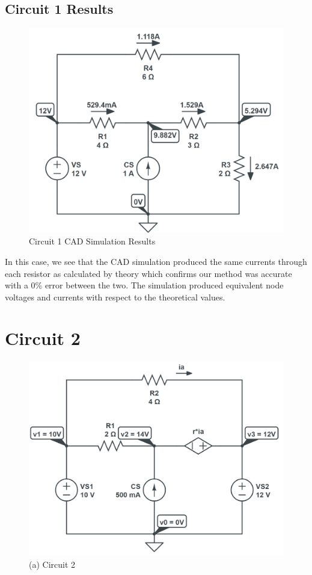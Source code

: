 \documentclass[12pt]{article}
\begin{document}
\subsection{Circuit 1 Results}
\begin{figure}[H]
    \begin{center}
        \includegraphics[scale=0.6]{circuit-1-sol.png}
        \caption { Circuit 1 CAD Simulation Results}
    \end{center}
\end{figure}

In this case, we see that the CAD simulation produced the same currents through each resistor as calculated by theory which confirms our method was accurate with a 0\% error between the two. The simulation produced equivalent node voltages and currents with respect to the theoretical values.

\section{Circuit 2}
\begin{figure}[H]
    \begin{center}
        \includegraphics[scale=0.5]{circuit-2.png}
        \caption { (a) Circuit 2}
    \end{center}
\end{figure}
\end{document}
